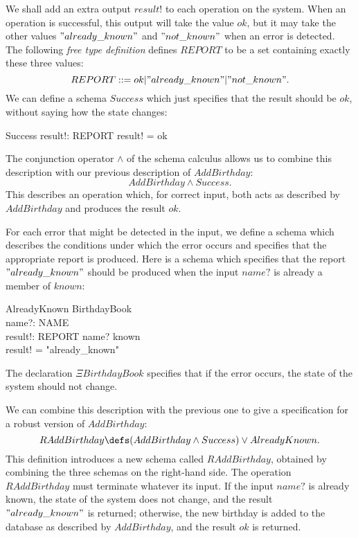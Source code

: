 We shall add an extra output $result!$ to each operation on the
system.  When an operation is successful, this output will take the
value $ok$, but it may take the other values $"already\_known"$ and
$"not\_known"$ when an error is detected. The following {\em free type
definition\/} defines $REPORT$ to be a set
containing exactly these three values:
\[ REPORT ::= ok | "already\_known" | "not\_known". \]
We can define a schema $Success$ which just specifies that the
result should be $ok$, without saying how the state changes:
\begin{schema}{Success}
	result!: REPORT
\where
	result! = ok
\end{schema}
The conjunction operator $\land$ of the schema calculus allows us to
combine this description with our previous description of $AddBirthday$:
\[ AddBirthday \land Success. \]
This describes an operation which, for correct input, both acts as
described by $AddBirthday$ and produces the result $ok$.

For each error that might be detected in the input, we define a schema
which describes the conditions under which the error occurs and
specifies that the appropriate report is produced. Here is a schema
which specifies that the report $"already\_known"$ should be produced
when the input $name?$ is already a member of $known$:
\begin{schema}{AlreadyKnown}
	\Xi BirthdayBook \\
	name?: NAME \\
	result!: REPORT
\where
	name? \in known \\
	result! = "already\_known"
\end{schema}
The declaration $\Xi BirthdayBook$ specifies that if the error occurs,
the state of the system should not change.

We can combine this description with the previous one to give a
specification for a robust version of $AddBirthday$:
\[ RAddBirthday \defs (AddBirthday \land Success) \lor AlreadyKnown. \]
This definition introduces a new schema called $RAddBirthday$,
obtained by combining the three schemas on the right-hand side.
The operation $RAddBirthday$ must terminate whatever its input.  If
the input $name?$ is already known, the state of the system does not
change, and the result $"already\_known"$ is returned; otherwise,
the new birthday is added to the database as described by
$AddBirthday$, and the result $ok$ is returned.

